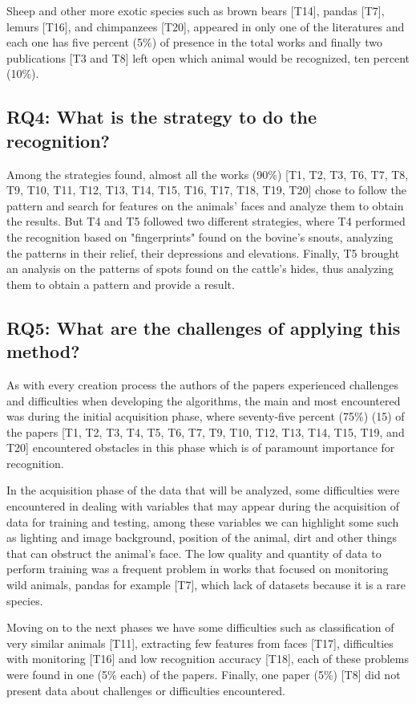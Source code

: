 \documentclass[alpha-refs,english]{RBCA_v3.0}
\begin{document}
Sheep and other more exotic species such as brown bears [T14], pandas [T7], lemurs [T16], and chimpanzees [T20], appeared in only one of the literatures and each one has five percent (5\%) of presence in the total works and finally two publications [T3 and T8] left open which animal would be recognized, ten percent (10\%).

\subsection{RQ4: What is the strategy to do the recognition?}
Among the strategies found, almost all the works (90\%) [T1, T2, T3, T6, T7, T8, T9, T10, T11, T12, T13, T14, T15, T16, T17, T18, T19, T20] chose to follow the pattern and search for features on the animals' faces and analyze them to obtain the results. But T4 and T5 followed two different strategies, where T4 performed the recognition based on "fingerprints" found on the bovine's snouts, analyzing the patterns in their relief, their depressions and elevations. Finally, T5 brought an analysis on the patterns of spots found on the cattle's hides, thus analyzing them to obtain a pattern and provide a result.

\subsection{RQ5: What are the challenges of applying this method?}
As with every creation process the authors of the papers experienced challenges and difficulties when developing the algorithms, the main and most encountered was during the initial acquisition phase, where seventy-five percent (75\%) (15) of the papers [T1, T2, T3, T4, T5, T6, T7, T9, T10, T12, T13, T14, T15, T19, and T20] encountered obstacles in this phase which is of paramount importance for recognition. 

In the acquisition phase of the data that will be analyzed, some difficulties were encountered in dealing with variables that may appear during the acquisition of data for training and testing, among these variables we can highlight some such as lighting and image background, position of the animal, dirt and other things that can obstruct the animal's face. The low quality and quantity of data to perform training was a frequent problem in works that focused on monitoring wild animals, pandas for example [T7], which lack of datasets because it is a rare species.

Moving on to the next phases we have some difficulties such as classification of very similar animals [T11], extracting few features from faces [T17], difficulties with monitoring [T16] and low recognition accuracy [T18], each of these problems were found in one (5\% each) of the papers. Finally, one paper (5\%) [T8] did not present data about challenges or difficulties encountered.
\end{document}
